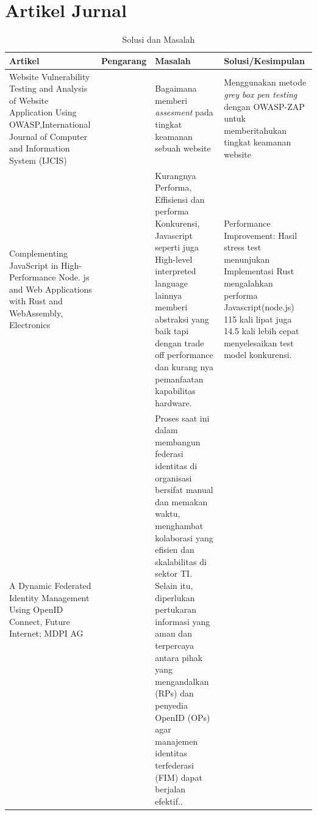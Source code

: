 \documentclass[12pt]{article}
\begin{document}
\section*{Artikel Jurnal}
\begin{center}
    \begin{longtable}{|p{4cm}|p{3cm}|p{4cm}|p{4cm}|}
        \caption{Solusi dan Masalah}
        \label{tab:table1}\\
        \hline
        Artikel & Pengarang & Masalah & Solusi/Kesimpulan \\
        \hline
        Website Vulnerability Testing and Analysis of Website Application Using OWASP,International Journal of Computer and Information System (IJCIS) 
        & \autocite{Priyawati2022WebsiteVT}
        & Bagaimana memberi \emph{assesment} pada tingkat keamanan sebuah website
        & Menggunakan metode \emph{grey box pen testing} dengan OWASP-ZAP untuk memberitahukan tingkat keamanan website\\
        \hline
        Complementing JavaScript in High-Performance Node. js and Web Applications with Rust and WebAssembly, Electronics
        & \autocite{kyriakou2022complementing}
        & Kurangnya Performa, Effisiensi dan performa Konkurensi, Javascript seperti juga High-level interpreted language lainnya memberi abstraksi yang baik tapi dengan trade off performance dan kurang nya pemanfaatan kapabilitas hardware.
        & Performance Improvement: Hasil stress test menunjukan Implementasi Rust mengalahkan performa Javascript(node.js) 115 kali lipat juga 14.5 kali lebih cepat menyelesaikan test model konkurensi.
        \\
        \hline
        A Dynamic Federated Identity Management Using OpenID Connect, Future Internet; MDPI AG
        & \autocite{ADynamicFederAlsade2022}
        & Proses saat ini dalam membangun federasi identitas di organisasi bersifat manual dan memakan waktu, menghambat kolaborasi yang efisien dan skalabilitas di sektor TI. Selain itu, diperlukan pertukaran informasi yang aman dan terpercaya antara pihak yang mengandalkan (RPs) dan penyedia OpenID (OPs) agar manajemen identitas terfederasi (FIM) dapat berjalan efektif..

\end{longtable}
\end{center}
\end{document}

